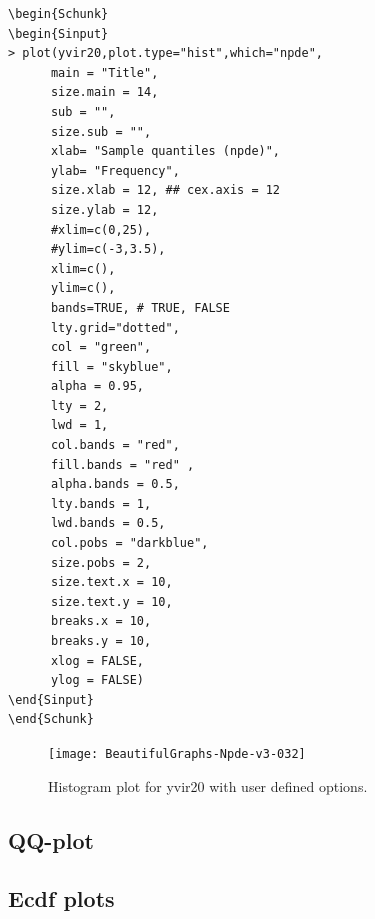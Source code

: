 \documentclass{report}
\begin{document}
\begin{lstlisting}[linerange=\\begin\{Sinput\}-\\end\{Sinput\}, includerangemarker=false]
\begin{Schunk}
\begin{Sinput}
> plot(yvir20,plot.type="hist",which="npde",
      main = "Title",
      size.main = 14,
      sub = "",
      size.sub = "",
      xlab= "Sample quantiles (npde)",
      ylab= "Frequency",
      size.xlab = 12, ## cex.axis = 12
      size.ylab = 12,
      #xlim=c(0,25),
      #ylim=c(-3,3.5),
      xlim=c(),
      ylim=c(),
      bands=TRUE, # TRUE, FALSE
      lty.grid="dotted",
      col = "green",
      fill = "skyblue",
      alpha = 0.95,
      lty = 2,
      lwd = 1,
      col.bands = "red",
      fill.bands = "red" ,
      alpha.bands = 0.5,
      lty.bands = 1,
      lwd.bands = 0.5,
      col.pobs = "darkblue",
      size.pobs = 2,
      size.text.x = 10,
      size.text.y = 10,
      breaks.x = 10,
      breaks.y = 10,
      xlog = FALSE,
      ylog = FALSE)
\end{Sinput}
\end{Schunk}
\end{lstlisting} 


\begin{figure}[H]
\caption{Histogram plot for yvir20 with user defined options.}
\label{fig:Histogram_plot01_yvir20}
\centering
\texttt{[image: BeautifulGraphs-Npde-v3-032]}
\end{figure}

\subsection{QQ-plot}

\subsection{Ecdf plots}

\end{document}

